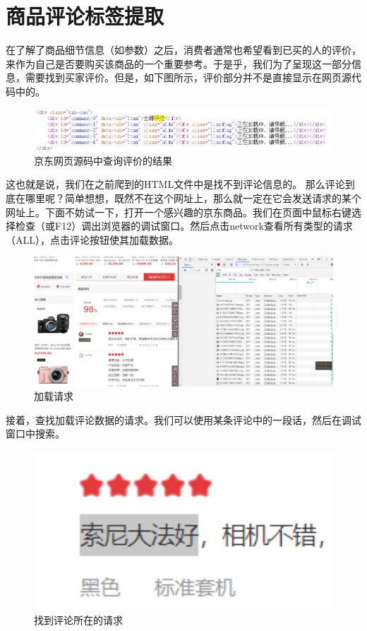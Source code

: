 \section{商品评论标签提取}
在了解了商品细节信息（如参数）之后，消费者通常也希望看到已买的人的评价，来作为自己是否要购买该商品的一个重要参考。于是乎，我们为了呈现这一部分信息，需要找到买家评价。但是，如下图所示，评价部分并不是直接显示在网页源代码中的。

\begin{figure}[htbp]
\centering
\includegraphics[width=13.5cm]{web source code jd.png}
\caption{京东网页源码中查询评价的结果} %
\end{figure}

这也就是说，我们在之前爬到的HTML文件中是找不到评论信息的。
那么评论到底在哪里呢？简单想想，既然不在这个网址上，那么就一定在它会发送请求的某个网址上。下面不妨试一下，打开一个感兴趣的京东商品。我们在页面中鼠标右键选择检查（或F12）调出浏览器的调试窗口。然后点击network查看所有类型的请求（ALL），点击评论按钮使其加载数据。

\begin{figure}[htbp]
\centering
\includegraphics[width=13.5cm]{network jd.png}
\caption{加载请求} %
\end{figure}

接着，查找加载评论数据的请求。我们可以使用某条评论中的一段话，然后在调试窗口中搜索。
\begin{figure}[htbp]
\centering
\includegraphics[width=13.5cm]{find request jd.png}
\caption{找到评论所在的请求} %
\end{figure}

